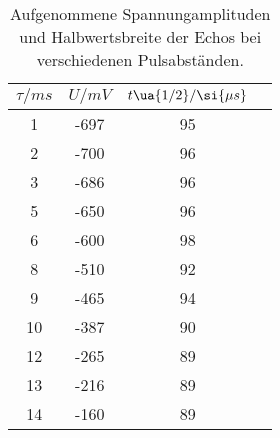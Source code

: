 \begin{table}
  \centering
  \caption{Aufgenommene Spannungamplituden und Halbwertsbreite der Echos bei
  verschiedenen Pulsabständen. }
  \label{tab:D}
  \begin{tabular}{S  S | S  S}
    \toprule
    {$\tau / \si{ms}$} & {$U / \si{mV}$} & {$t\ua{1/2} / \si{\mu s}$} \\
      & -697 & 95 \\
    2  & -700 & 96 \\
    3  & -686 & 96 \\
    5  & -650 & 96 \\
    6  & -600 & 98 \\
    8  & -510 & 92 \\
    9  & -465 & 94 \\
    10 & -387 & 90 \\
    12 & -265 & 89 \\
    13 & -216 & 89 \\
    14 & -160 & 89
    \bottomrule
  \end{tabular}
\end{table}
